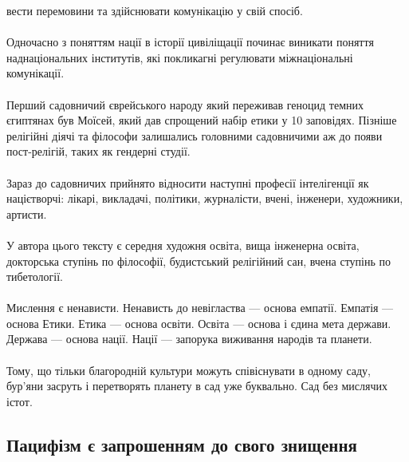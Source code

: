 вести перемовини та здійснювати комунікацію у свій спосіб.
\\
\\
Одночасно з поняттям нації в історії цивіліщації починає виникати поняття наднаціональних інститутів,
які покликагні регулювати міжнаціональні комунікації.
\\
\\
Перший садовничий єврейського народу який переживав геноцид темних єгиптянах був Моїсей,
який дав спрощений набір етики у 10 заповідях. Пізніше релігійні діячі та філософи
залишались головними садовничими аж до появи пост-релігій, таких як гендерні студії.
\\
\\
Зараз до садовничих прийнято відносити наступні професії інтелігенції як націєтворчі:
лікарі, викладачі, політики, журналісти, вчені, інженери, художники, артисти.
\\
\\
У автора цього тексту є середня художня освіта, вища інженерна освіта,
докторська ступінь по філософії, будистський релігійний сан, вчена ступінь по тибетології.
\\
\\
Мислення є ненависти. Ненависть до невігластва --- основа емпатії.
Емпатія --- основа Етики.
Етика --- основа освіти.
Освіта --- основа і єдина мета держави.
Держава --- основа нації.
Нації --- запорука виживання народів та планети.
\\
\\
Тому, що тільки благородній культури можуть співіснувати в одному саду, бур'яни засруть і перетворять
планету в сад уже буквально. Сад без мислячих істот.

\subsection{Пацифізм є запрошенням до свого знищення}

